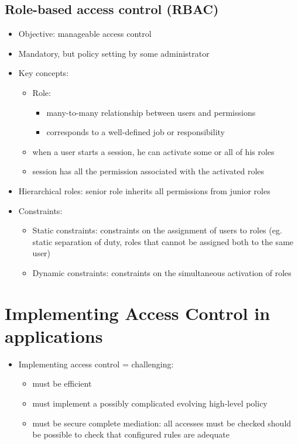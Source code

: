 \documentclass[12pt,titlepage,a4paper]{report}
\begin{document}
			\subsection{Role-based access control (RBAC)}
			\begin{itemize}
				\item Objective: manageable access control
				\item Mandatory,  but policy setting by some administrator
				\item Key concepts:
				\begin{itemize}
					\item Role:
					\begin{itemize}
						\item many-to-many relationship between users and permissions
						\item corresponds to a well-defined job or responsibility
					\end{itemize}
					\item when a user starts a session, he can activate some or all of his roles
					\item session has all the permission associated with the activated roles
				\end{itemize}
				\item Hierarchical roles: senior role inherits all permissions from junior roles
				\item Constraints:
				\begin{itemize}
					\item Static constraints: constraints on the assignment of users to roles (eg. static separation of duty, roles that cannot be assigned both to the same user)
					\item Dynamic constraints: constraints on the simultaneous activation of roles
				\end{itemize}
			\end{itemize}

		\section{Implementing Access Control in applications}
			\begin{itemize}
				\item Implementing access control = challenging:
				\begin{itemize}
					\item must be efficient
					\item must implement a possibly complicated evolving high-level policy
					\item must be secure
						\subitem complete mediation: all accesses must be checked
						\subitem should be possible to check that configured rules are adequate
				\end{itemize}
			\end{itemize}
\end{document}
